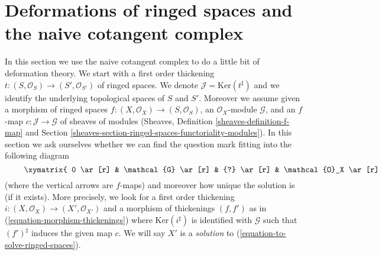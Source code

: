 \section{Deformations of ringed spaces and the naive cotangent complex}
\label{section-deformations-ringed-spaces}

\noindent
In this section we use the naive cotangent complex to do a little bit
of deformation theory. We start with a first order thickening
$t : (S, \mathcal{O}_S) \to (S', \mathcal{O}_{S'})$ of ringed spaces.
We denote $\mathcal{J} = \text{Ker}(t^\sharp)$ and we
identify the underlying topological spaces of $S$ and $S'$.
Moreover we assume given a morphism of ringed spaces
$f : (X, \mathcal{O}_X) \to (S, \mathcal{O}_S)$, an $\mathcal{O}_X$-module
$\mathcal{G}$, and an $f$-map $c : \mathcal{J} \to \mathcal{G}$
of sheaves of modules (Sheaves, Definition \ref{sheaves-definition-f-map}
and Section \ref{sheaves-section-ringed-spaces-functoriality-modules}).
In this section we ask ourselves whether we can find
the question mark fitting into the following diagram
\begin{equation}
\label{equation-to-solve-ringed-spaces}
\vcenter{
\xymatrix{
0 \ar[r] & \mathcal{G} \ar[r] & {?} \ar[r] & \mathcal{O}_X \ar[r] & 0 \\
0 \ar[r] & \mathcal{J} \ar[u]^c \ar[r] & \mathcal{O}_{S'} \ar[u] \ar[r] &
\mathcal{O}_S \ar[u] \ar[r] & 0
}
}
\end{equation}
(where the vertical arrows are $f$-maps)
and moreover how unique the solution is (if it exists). More precisely,
we look for a first order thickening
$i : (X, \mathcal{O}_X) \to (X', \mathcal{O}_{X'})$
and a morphism of thickenings $(f, f')$ as in
(\ref{equation-morphism-thickenings})
where $\text{Ker}(i^\sharp)$ is identified with $\mathcal{G}$
such that $(f')^\sharp$ induces the given map $c$.
We will say $X'$ is a {\it solution} to
(\ref{equation-to-solve-ringed-spaces}).


